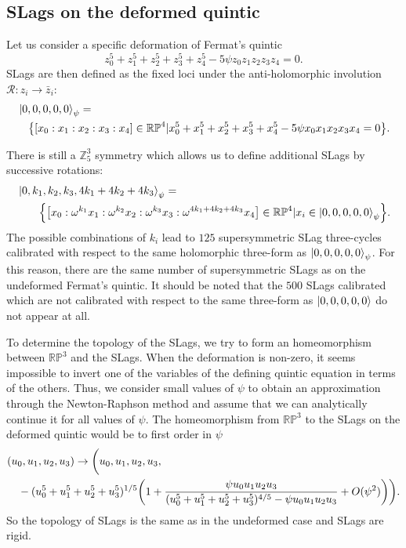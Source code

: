 \subsection{SLags on the deformed quintic}
Let us consider a specific deformation of Fermat's quintic
\begin{equation}
  z_0^5+z_1^5+z_2^5+z_3^5+z_4^5- 5\psi z_0z_1z_2z_3z_4=0.
\end{equation}
SLags are then defined as the fixed loci under the anti-holomorphic involution $\mathcal R: z_i \to \bar z_i$:
\begin{align}
  &\ket{0,0,0,0,0}_\psi= \nonumber \\
  &\quad\qty{\qty[x_0:x_1:x_2:x_3:x_4]\in  \mathbb{RP}^4| x_0^5+x_1^5+x_2^5+x_3^5+x_4^5-5\psi x_0x_1x_2x_3x_4=0}.
\end{align}

There is still a $\mathbb Z_5^3$ symmetry which allows us to define additional SLags by successive rotations:
\begin{align}
 &\ket{0,k_1,k_2,k_3,4k_1+4k_2+4k_3}_\psi=\nonumber\\
 &\qquad\qty{\qty[x_0:\omega^{k_1}x_1:\omega^{k_2}x_2:\omega^{k_3}x_3:\omega^{4k_1+4k_2+4k_3}x_4]\in  \mathbb{RP}^4|x_i\in\ket{0,0,0,0,0}_\psi}.
\end{align}
The possible combinations of $k_i$ lead to $125$ supersymmetric SLag three-cycles
calibrated with respect to the same holomorphic three-form as $\ket{0,0,0,0,0}_{\psi}$.
For this reason, there are the same number of supersymmetric SLags as on the undeformed Fermat's quintic.
It should be noted that the $500$ SLags calibrated which are not calibrated with respect to the same three-form as $\ket{0,0,0,0,0}$ 
do not appear at all.
 
To determine the topology of the SLags, we try to form an homeomorphism between $\mathbb{RP}^3$ and the SLags.
When the deformation is non-zero, it seems impossible to invert one of the variables of the defining
quintic equation in terms of the others.
Thus, we consider small values of $\psi$ to obtain an approximation through the Newton-Raphson method
and assume that we can analytically continue it for all values of $\psi$.
The homeomorphism from $\mathbb{RP}^3$ to the SLags on the deformed quintic would be to first order in $\psi$
\begin{align}
  &(u_0,u_1,u_2,u_3) \to \bigg(u_0,u_1,u_2,u_3,\nonumber\\
  &\quad-(u_0^5+u_1^5+u_2^5+u_3^5)^{1/5} \qty(1+\frac{\psi u_0u_1u_2u_3}{(u_0^5+u_1^5+u_2^5+u_3^5)^{4/5}-\psi u_0u_1u_2u_3}+O(\psi^2))\bigg).
\end{align}
So the topology of SLags is the same as in the  undeformed case and SLags are rigid.

